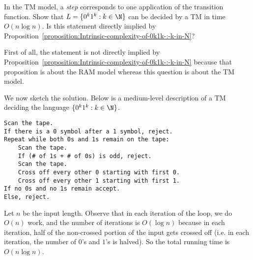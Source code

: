 \begin{flex}
\label{grp:exercise:TM-complexity-of-0k1k-:-k-in-N}

\begin{exercise}[TM complexity of $\{0^k1^k : k \in \N\}$]
\label{exercise:TM-complexity-of-0k1k-:-k-in-N}
In the TM model, a \emph{step} corresponds to one application of the transition function. Show that $L = \{0^k1^k : k \in \N\}$ can be decided by a TM in time $O(n \log n)$. Is this statement directly implied by Proposition~\ref{proposition:Intrinsic-complexity-of-0k1k-:-k-in-N}?

\end{exercise}

\begin{solution}
\label{sol:time-complexity::statement}
First of all, the statement is not directly implied by Proposition~\ref{proposition:Intrinsic-complexity-of-0k1k-:-k-in-N} because that proposition is about the RAM model whereas this question is about the TM model.

We now sketch the solution. Below is a medium-level description of a TM deciding the language $\{0^k1^k : k \in \N\}$.

\begin{verbatim}
Scan the tape.
If there is a 0 symbol after a 1 symbol, reject.
Repeat while both 0s and 1s remain on the tape:
    Scan the tape. 
    If (# of 1s + # of 0s) is odd, reject.
    Scan the tape. 
    Cross off every other 0 starting with first 0.
    Cross off every other 1 starting with first 1.
If no 0s and no 1s remain accept.
Else, reject. 
\end{verbatim}

Let $n$ be the input length. Observe that in each iteration of the loop, we do $O(n)$ work, and the number of iterations is $O(\log n)$ because in each iteration, half of the non-crossed portion of the input gets crossed off (i.e. in each iteration, the number of $0$'s and $1$'s is halved). So the total running time is $O(n \log n)$.

\end{solution}
\end{flex}

